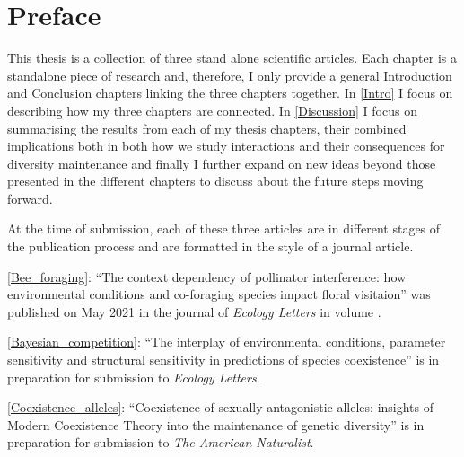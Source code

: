 

\chapter*{Preface} %
This thesis is a collection of three stand alone scientific articles. Each chapter is a standalone piece of research and, therefore, I only provide a general Introduction and Conclusion chapters linking the three chapters together. In  \autoref{Intro} I focus on describing how my three chapters are connected. In  \autoref{Discussion} I focus on summarising the results from each of my thesis chapters, their combined implications both in both how we study interactions and their consequences for diversity maintenance and finally I further expand on new ideas beyond those presented in the different chapters to discuss about the future steps moving forward.


At the time of submission, each of these three articles are in different stages of the publication process and are formatted in the style of a journal article.

\autoref{Bee_foraging}: ``The context dependency of pollinator interference: how environmental conditions and co-foraging species impact floral visitaion'' was published on May 2021 in the journal of  \textit{Ecology Letters} in volume .

\autoref{Bayesian_competition}: ``The interplay of environmental conditions, parameter sensitivity and structural sensitivity in predictions of species coexistence'' is in preparation for submission to \textit{Ecology Letters}.

\autoref{Coexistence_alleles}: ``Coexistence of sexually antagonistic alleles: insights of Modern Coexistence Theory into the maintenance of genetic diversity'' is in preparation for submission to \textit{The American Naturalist}. 



